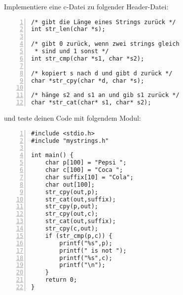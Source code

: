 \documentclass{uebungszettel}
\begin{document}
\newpage

\begin{aufg} Implementiere eine c-Datei zu folgender Header-Datei: 
\begin{codelisting}
\begin{lstlisting}[numbers=left,numberstyle=\tiny,frame=tlrb]
/* gibt die Länge eines Strings zurück */
int str_len(char *s); 

/* gibt 0 zurück, wenn zwei strings gleich 
 * sind und 1 sonst */
int str_cmp(char *s1, char *s2);

/* kopiert s nach d und gibt d zurück */
char *str_cpy(char *d, char *s);

/* hänge s2 and s1 an und gib s1 zurück */ 
char *str_cat(char* s1, char* s2);
\end{lstlisting}
\end{codelisting}
und teste deinen Code mit folgendem Modul:
\begin{codelisting}
\begin{lstlisting}[numbers=left,numberstyle=\tiny,frame=tlrb]
#include <stdio.h>
#include "mystrings.h"

int main() {
	char p[100] = "Pepsi ";
	char c[100] = "Coca ";
	char suffix[10] = "Cola";
	char out[100];
	str_cpy(out,p); 
	str_cat(out,suffix); 
	str_cpy(p,out);
	str_cpy(out,c);
	str_cat(out,suffix);
	str_cpy(c,out);
	if (str_cmp(p,c)) {
		printf("%s",p);
		printf(" is not ");
		printf("%s",c);
		printf("\n");
	}
	return 0;
}
\end{lstlisting}
\end{codelisting}
\end{aufg}
\end{document}
